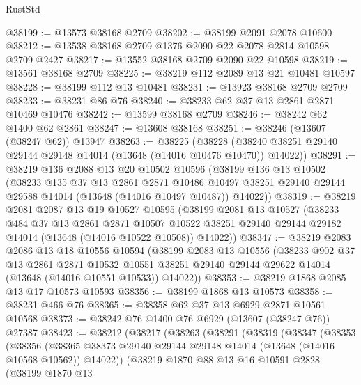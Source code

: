 \begin{lexlean}{RustStd}
\begin{coremodule}
@38199 := @13573 @38168 @2709
@38202 := @38199 @2091 @2078 @10600
@38212 := @13538 @38168 @2709 @1376 @2090 @22 @2078 @2814 @10598 @2709 @2427
@38217 := @13552 @38168 @2709 @2090 @22 @10598
@38219 := @13561 @38168 @2709
@38225 := @38219 @112 @2089 @13 @21 @10481 @10597
@38228 := @38199 @112 @13 @10481
@38231 := @13923 @38168 @2709 @2709
@38233 := @38231 @86 @76
@38240 := @38233 @62 @37 @13 @2861 @2871 @10469 @10476
@38242 := @13599 @38168 @2709
@38246 := @38242 @62 @1400 @62 @2861
@38247 := @13608 @38168
@38251 := @38246 (@13607 (@38247 @62)) @13947
@38263 := @38225
    (@38228 (@38240 @38251 @29140 @29144 @29148 @14014 (@13648 (@14016 @10476 @10470)) @14022))
@38291 := @38219
    @136
    @2088
    @13
    @20
    @10502
    @10596
    (@38199
      @136
      @13
      @10502
      (@38233
        @135
        @37
        @13
        @2861
        @2871
        @10486
        @10497
        @38251
        @29140
        @29144
        @29588
        @14014
        (@13648 (@14016 @10497 @10487))
        @14022))
@38319 := @38219
    @2081
    @2087
    @13
    @19
    @10527
    @10595
    (@38199
      @2081
      @13
      @10527
      (@38233
        @484
        @37
        @13
        @2861
        @2871
        @10507
        @10522
        @38251
        @29140
        @29144
        @29182
        @14014
        (@13648 (@14016 @10522 @10508))
        @14022))
@38347 := @38219
    @2083
    @2086
    @13
    @18
    @10556
    @10594
    (@38199
      @2083
      @13
      @10556
      (@38233
        @902
        @37
        @13
        @2861
        @2871
        @10532
        @10551
        @38251
        @29140
        @29144
        @29622
        @14014
        (@13648 (@14016 @10551 @10533))
        @14022))
@38353 := @38219 @1868 @2085 @13 @17 @10573 @10593
@38356 := @38199 @1868 @13 @10573
@38358 := @38231 @466 @76
@38365 := @38358 @62 @37 @13 @6929 @2871 @10561 @10568
@38373 := @38242 @76 @1400 @76 @6929 (@13607 (@38247 @76)) @27387
@38423 := @38212
    (@38217
      (@38263
        (@38291
          (@38319
            (@38347
              (@38353
                (@38356
                  (@38365
                    @38373
                    @29140
                    @29144
                    @29148
                    @14014
                    (@13648 (@14016 @10568 @10562))
                    @14022))
                (@38219
                  @1870
                  @88
                  @13
                  @16
                  @10591
                  @2828
                  (@38199
                    @1870
                    @13

\end{coremodule}
\end{lexlean}
